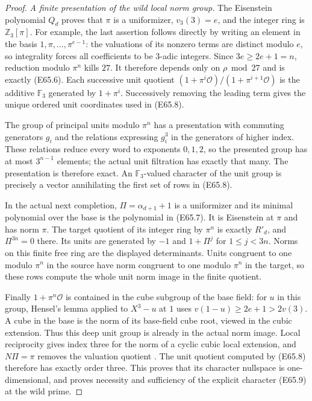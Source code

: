 \begin{proof}
\emph{A finite presentation of the wild local norm group.}
The Eisenstein polynomial $Q_d$ proves that $\pi$ is a uniformizer,
$v_3(3)=e$, and the integer ring is $\mathbb Z_3[\pi]$.
For example, the last assertion follows directly by writing an
element in the basis $1,\pi,\ldots,\pi^{e-1}$: the valuations of
its nonzero terms are distinct modulo $e$, so integrality forces
all coefficients to be $3$-adic integers.
Since $3e\ge2e+1=n$, reduction modulo $\pi^n$ kills $27$.
It therefore depends only on $\rho\bmod27$ and is exactly (E65.6).
Each successive unit quotient
$(1+\pi^i\mathcal O)/(1+\pi^{i+1}\mathcal O)$ is the additive
$\mathbb F_3$ generated by $1+\pi^i$.
Successively removing the leading term gives the unique ordered
unit coordinates used in (E65.8).

The group of principal units modulo $\pi^n$ has a presentation with
commuting generators $g_i$ and the relations expressing $g_i^3$ in
the generators of higher index. These relations reduce every word
to exponents $0,1,2$, so the presented group has at most
$3^{n-1}$ elements; the actual unit filtration has exactly that many.
The presentation is therefore exact. An $\mathbb F_3$-valued
character of the unit group is precisely a vector annihilating the
first set of rows in (E65.8).

In the actual next completion, $\Pi=\alpha_{d+1}+1$ is a uniformizer
and its minimal polynomial over the base is the polynomial in
(E65.7). It is Eisenstein at $\pi$ and has norm $\pi$.
The target quotient of its integer ring by $\pi^n$ is exactly
$R'_d$, and $\Pi^{3n}=0$ there.
Its units are generated by $-1$ and
$1+\Pi^j$ for $1\le j<3n$.
Norms on this finite free ring are the displayed determinants.
Units congruent to one modulo $\pi^n$ in the source have norm
congruent to one modulo $\pi^n$ in the target, so these rows compute
the whole unit norm image in the finite quotient.

Finally $1+\pi^n\mathcal O$ is contained in the cube subgroup of
the base field: for $u$ in this group, Hensel's lemma applied to
$X^3-u$ at $1$ uses
$v(1-u)\ge2e+1>2v(3)$.
A cube in the base is the norm of its base-field cube root, viewed
in the cubic extension. Thus this deep unit group is already in
the actual norm image.
Local reciprocity gives index three for the norm of a cyclic cubic
local extension, and $N\Pi=\pi$ removes the valuation quotient
\cite[III, Theorem3.4 and its norm-index proof]{E_MilneCFT}.
The unit quotient computed by (E65.8) therefore has exactly order
three. This proves that its character nullspace is one-dimensional,
and proves necessity and sufficiency of the explicit character
(E65.9) at the wild prime.


\end{proof}
